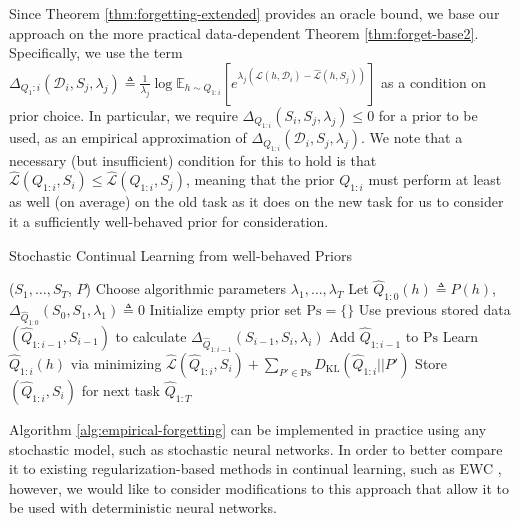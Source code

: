 \documentclass{article}
\theoremstyle{plain}
\theoremstyle{definition}
\theoremstyle{remark}
\begin{document}
Since Theorem \ref{thm:forgetting-extended} provides an oracle bound, we base our approach on the more practical data-dependent Theorem \ref{thm:forget-base2}.
Specifically, we use the term $\Delta_{Q_1:i}(\mathcal{D}_i,S_j, \lambda_j)\triangleq \frac{1}{\lambda_j}\log\mathbb{E}_{h\sim Q_{1:i}}\left [e^{\lambda_j(\mathcal{L}(h,\mathcal{D}_i)-\hat{\mathcal{L}}(h,S_j))} \right ]$ as a condition on prior choice. In particular, we require $\Delta_{Q_{1:i}}(S_i,S_j, \lambda_j)\leq 0$ for a prior to be used, as an empirical approximation of $\Delta_{Q_{1:i}}(\mathcal{D}_i,S_j, \lambda_j)$. 
We note that a necessary (but insufficient) condition for this to hold is that $\hat{\mathcal{L}}(Q_{1:i},S_i)\leq \hat{\mathcal{L}}(Q_{1:i},S_j)$, meaning that the prior $Q_{1:i}$ must perform at least as well (on average) on the old task as it does on the new task for us to consider it a sufficiently well-behaved prior for consideration.
%
\begin{algorithm}[H]
	\caption{Stochastic Continual Learning from well-behaved Priors}
	\label{alg:empirical-forgetting}
	\small
	\begin{algorithmic}[1]
		 ($S_1,\ldots, S_T$, $P$)
		\STATE Choose algorithmic parameters $\lambda_1,\ldots,\lambda_T$
		\STATE Let $\hat{Q}_{1:0}(h) \triangleq P(h)$, $\Delta_{\hat{Q}_{1:0}}(S_{0},S_1, \lambda_1)\triangleq 0$
            \STATE Initialize empty prior set $\mathrm{Ps}=\{\}$
            \STATE Use previous stored data $(\hat{Q}_{1:i-1}, S_{i-1})$ to calculate $\Delta_{\hat{Q}_{1:i-1}}(S_{i-1},S_i, \lambda_i)$ 
                \STATE Add $\hat{Q}_{1:i-1}$ to $\mathrm{Ps}$
            \ENDIF
            \STATE Learn $\hat{Q}_{1:i}(h)$ via minimizing $\hat{\mathcal{L}}(\hat{Q}_{1:i},S_i)+\sum_{P'\in \mathrm{Ps}} D_{\mathrm{{KL}}}(\hat{Q}_{1:i}|| P')$ 
		\STATE Store $(\hat{Q}_{1:i}, S_i)$ for next task
		\ENDFOR
		 $\hat{Q}_{1:T}$
	\end{algorithmic}
\end{algorithm}
%
Algorithm \ref{alg:empirical-forgetting} can be implemented in practice using any stochastic model, such as stochastic neural networks. In order to better compare it to existing regularization-based methods in continual learning, such as EWC \citep{kirkpatrick2017overcoming}, however, we would like to consider modifications to this approach that allow it to be used with deterministic neural networks. 
\end{document}
